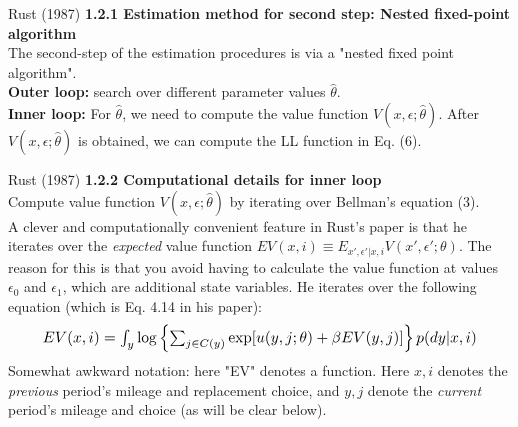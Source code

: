 \documentclass[xcolor=pdftex,dvipsnames,table,mathserif]{beamer}
\begin{document}
\begin{frame}{Rust (1987)}
\vspace{.5mm}
\textbf{1.2.1 Estimation method for second step: Nested fixed-point algorithm} \\
\vspace{3mm}
The second-step of the estimation procedures is via a "nested fixed point algorithm". \\
\vspace{3mm}
\textbf{Outer loop:} search over different parameter values $\hat \theta$. \\
\vspace{3mm}
\textbf{Inner loop:} For $\hat \theta$, we need to compute the value function $V(x, \epsilon;\hat \theta)$. After $V(x, \epsilon;\hat \theta)$ is obtained, we can compute the LL function in Eq. (6). 
\end{frame}

\begin{frame}{Rust (1987)}
\vspace{.5mm}
\textbf{1.2.2 Computational details for inner loop} \\
\vspace{3mm}
Compute value function $V(x, \epsilon; \hat \theta)$ by iterating over Bellman's equation (3). \\
\vspace{3mm}
A clever and computationally convenient feature in Rust's paper is that he iterates over the \emph{expected} value function $EV(x, i) \equiv E_{x', \epsilon ' | x, i} V(x', \epsilon ' ; \theta)$. The reason for this is that you avoid having to calculate the value function at values $\epsilon_0$ and $\epsilon_1$, which are additional state variables. He iterates over the following equation (which is Eq. 4.14 in his paper): 
\begin{equation}
\resizebox{.9\hsize}{!}{$EV(x,i) = \int_y \log \left \{ \sum_{j \in C(y)} \exp [ u(y,j; \theta) + \beta EV(y, j)] \right \} p(dy|x,i) $}
\end{equation}
Somewhat awkward notation: here "EV" denotes a function. Here $x, i$ denotes the \emph{previous} period's mileage and replacement choice, and $y, j$ denote the \emph{current} period's mileage and choice (as will be clear below). 
\end{frame}
\end{document}
